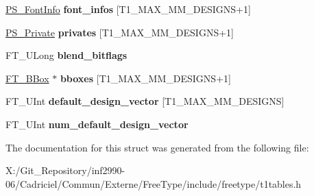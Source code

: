 \begin{DoxyCompactItemize}
\item 
\hypertarget{struct_p_s___blend_rec___ac5478cafc838257e693a9604edf1f5e9}{\hyperlink{struct_p_s___font_info_rec__}{P\-S\-\_\-\-Font\-Info} {\bfseries font\-\_\-infos} \mbox{[}T1\-\_\-\-M\-A\-X\-\_\-\-M\-M\-\_\-\-D\-E\-S\-I\-G\-N\-S+1\mbox{]}}\label{struct_p_s___blend_rec___ac5478cafc838257e693a9604edf1f5e9}

\item 
\hypertarget{struct_p_s___blend_rec___a2b6e0c48d7a9c350b09f2943c1779ea4}{\hyperlink{struct_p_s___private_rec__}{P\-S\-\_\-\-Private} {\bfseries privates} \mbox{[}T1\-\_\-\-M\-A\-X\-\_\-\-M\-M\-\_\-\-D\-E\-S\-I\-G\-N\-S+1\mbox{]}}\label{struct_p_s___blend_rec___a2b6e0c48d7a9c350b09f2943c1779ea4}

\item 
\hypertarget{struct_p_s___blend_rec___a86caa5319e208b4a2057db656bad9221}{F\-T\-\_\-\-U\-Long {\bfseries blend\-\_\-bitflags}}\label{struct_p_s___blend_rec___a86caa5319e208b4a2057db656bad9221}

\item 
\hypertarget{struct_p_s___blend_rec___a30845d3cbd2e95a5f9cc867c7226af5e}{\hyperlink{struct_f_t___b_box__}{F\-T\-\_\-\-B\-Box} $\ast$ {\bfseries bboxes} \mbox{[}T1\-\_\-\-M\-A\-X\-\_\-\-M\-M\-\_\-\-D\-E\-S\-I\-G\-N\-S+1\mbox{]}}\label{struct_p_s___blend_rec___a30845d3cbd2e95a5f9cc867c7226af5e}

\item 
\hypertarget{struct_p_s___blend_rec___a3ddacbda91fe0f9ef934a9e0afa6286f}{F\-T\-\_\-\-U\-Int {\bfseries default\-\_\-design\-\_\-vector} \mbox{[}T1\-\_\-\-M\-A\-X\-\_\-\-M\-M\-\_\-\-D\-E\-S\-I\-G\-N\-S\mbox{]}}\label{struct_p_s___blend_rec___a3ddacbda91fe0f9ef934a9e0afa6286f}

\item 
\hypertarget{struct_p_s___blend_rec___afa5c7dd4206eb8a1d9ef4894abfc9555}{F\-T\-\_\-\-U\-Int {\bfseries num\-\_\-default\-\_\-design\-\_\-vector}}\label{struct_p_s___blend_rec___afa5c7dd4206eb8a1d9ef4894abfc9555}

\end{DoxyCompactItemize}


The documentation for this struct was generated from the following file\-:\begin{DoxyCompactItemize}
\item 
X\-:/\-Git\-\_\-\-Repository/inf2990-\/06/\-Cadriciel/\-Commun/\-Externe/\-Free\-Type/include/freetype/t1tables.\-h\end{DoxyCompactItemize}
